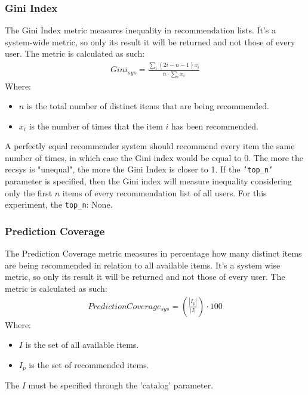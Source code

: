 \documentclass[11pt]{article}
\begin{document}
\subsubsection{Gini Index}\label{subsubsec:gini}
The Gini Index metric measures inequality in recommendation lists.
It's a system-wide metric, so only its result it will be returned and not those of every user.
The metric is calculated as such:
\hfill\break
\hfill\break
    \[
       \begin{gathered}
           Gini_{sys} = \frac{\sum_i(2i - n - 1)x_i}{n\cdot\sum_i x_i}
       \end{gathered}
    \]
\hfill\break
\hfill\break
    Where:
\begin{itemize}
    \item $n$ is the total number of distinct items that are being recommended.
    \item $x_i$ is the number of times that the item $i$ has been recommended.
\end{itemize}
\hfill\break
\hfill\break
A perfectly equal recommender system should recommend every item the same number of times, in which case the Gini
index would be equal to 0.
The more the recsys is "unequal", the more the Gini Index is closer to 1.
If the \texttt{'top\_n'} parameter is specified, then the Gini index will measure inequality considering only
the first $n$ items of every recommendation list of all users.
For this experiment, the \texttt{top\_n}:
None.
\hfill\break
\hfill\break

\subsubsection{Prediction Coverage}\label{subsubsec:pred_cov}
The Prediction Coverage metric measures in percentage how many distinct items are being recommended in relation
to all available items.
It's a system wise metric, so only its result it will be returned and not those of every user.
The metric is calculated as such:
\hfill\break
\hfill\break
    \[
       \begin{gathered}
           Prediction Coverage_{sys} = (\frac{|I_p|}{|I|})\cdot100
       \end{gathered}
    \]
\hfill\break
\hfill\break
    Where:
\begin{itemize}
    \item $I$ is the set of all available items.
    \item $I_p$ is the set of recommended items.
\end{itemize}
\hfill\break
\hfill\break
The $I$ must be specified through the 'catalog' parameter.
\hfill\break
\hfill\break
\end{document}
